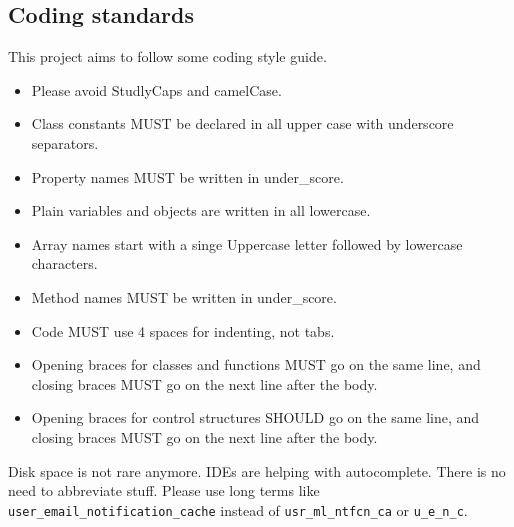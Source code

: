 \subsection{Coding standards}
This project aims to follow some coding style guide.
\begin{itemize}
\item Please avoid StudlyCaps and camelCase.
\item Class constants MUST be declared in all upper case with underscore separators.
\item Property names MUST be written in under{\_}score.
\item Plain variables and objects are written in all lowercase.
\item Array names start with a singe Uppercase letter followed by lowercase characters.
\item Method names MUST be written in under{\_}score.

\item Code MUST use 4 spaces for indenting, not tabs.
\item Opening braces for classes and functions MUST go on the same line, and closing braces MUST go on the next line after the body.
\item Opening braces for control structures SHOULD go on the same line, and closing
braces MUST go on the next line after the body.
\end{itemize}
Disk space is not rare anymore. IDEs are helping with autocomplete. There is no need to abbreviate stuff. Please use long terms like \lstinline|user_email_notification_cache| instead of \lstinline|usr_ml_ntfcn_ca| or \lstinline|u_e_n_c|. 

